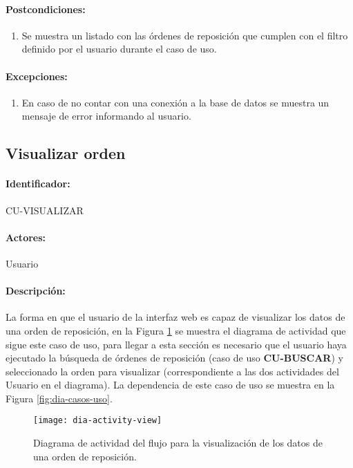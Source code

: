 \paragraph{Postcondiciones:}
\begin{enumerate}
  \item Se muestra un listado con las órdenes de reposición que cumplen con el filtro definido por el usuario durante el caso de uso.
\end{enumerate}
\paragraph{Excepciones:}
\begin{enumerate}
  \item En caso de no contar con una conexión a la base de datos se muestra un mensaje de error informando al usuario.
\end{enumerate}


\subsection{Visualizar orden}\label{cu-visualizar}
\paragraph{Identificador:}
CU-VISUALIZAR
\paragraph{Actores:}
Usuario
\paragraph{Descripción:}
La forma en que el usuario de la interfaz web es capaz de visualizar los datos de una orden de reposición, en la Figura \ref{fig:dia-activity-view} se muestra el diagrama de actividad que sigue este caso de uso, para llegar a esta sección es necesario que el usuario haya ejecutado la búsqueda de órdenes de reposición (caso de uso \textbf{CU-BUSCAR}) y seleccionado la orden para visualizar (correspondiente a las dos actividades del Usuario en el diagrama). La dependencia de este caso de uso se muestra en la Figura \ref{fig:dia-casos-uso}.
\begin{figure}[h]
  \centering
  \texttt{[image: dia-activity-view]}
  \caption{Diagrama de actividad del flujo para la visualización de los datos de una orden de reposición.}
  \label{fig:dia-activity-view}
\end{figure}
